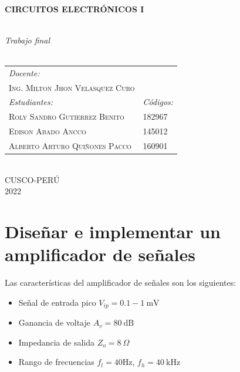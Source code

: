 \documentclass[a4paper, 12pt]{article}
\begin{document}
\begin{titlepage}
	 \HRule \\[0.4cm]
     { \huge \bfseries CIRCUITOS ELECTRÓNICOS I}\\[1.8mm] 
	 \HRule\\[5mm]
     \begin{minipage}{\textwidth}
        \center
        \textit{Trabajo final}\\[0.2cm]
        \\[3mm]
		\begin{tabular}{ll}
        \emph{Docente:} \\[1.8mm]
            \hspace{1.4cm}\textsc{Ing. Milton Jhon Velasquez Curo}\\[3mm]
        \emph{Estudiantes:} & \quad \emph{Códigos:}\\[1.8mm]
            \hspace{1.4cm} \textsc{Roly Sandro Gutierrez Benito} & \hspace{1.7cm} 182967\\[3mm]
            \hspace{1.4cm} \textsc{Edison Abado Ancco} & \hspace{1.7cm} 145012\\[3mm]
            \hspace{1.4cm} \textsc{Alberto Arturo Quiñones Pacco}& \hspace{1.7cm} 160901\\[3mm]
		 \end{tabular} \\[3.5mm]
		 \textsc{CUSCO-PERÚ}\\
         \textsc{2022}
     \end{minipage}
\end{titlepage}
\newpage
\tableofcontents

\newpage
\section{Diseñar e implementar un amplificador de señales}
Las características del amplificador de señales son los siguientes:
\begin{itemize}
    \item Señal de entrada pico $V_{ip} = 0.1 - 1\ \text{mV}$
    \item Ganancia de voltaje $A_v = 80\ \text{dB}$
    \item Impedancia de salida $Z_o = 8\ \Omega$
    \item Rango de frecuencias $f_l = 40 \text{Hz}$, $f_h = 40\ \text{kHz}$ 
\end{itemize}
\end{document}
